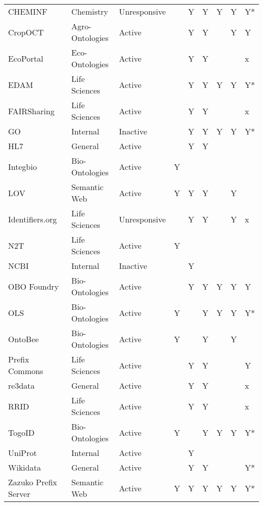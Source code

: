 \begin{table}
\begin{tabular}{lllllllll}
CHEMINF~\cite{Hastings2011} & Chemistry & Unresponsive &  & Y & Y & Y & Y & Y* \\
CropOCT~\cite{Arnaud2020} & Agro-Ontologies & Active &  & Y & Y &  & Y & Y \\
EcoPortal~\cite{Kechagioglou2021} & Eco-Ontologies & Active &  & Y & Y &  &  & x \\
EDAM~\cite{Ison2013} & Life Sciences & Active &  & Y & Y & Y & Y & Y* \\
FAIRSharing~\cite{Sansone2019} & Life Sciences & Active &  & Y & Y &  &  & x \\
GO~\cite{TheGeneOntologyConsortium2019} & Internal & Inactive &  & Y & Y & Y & Y & Y* \\
HL7~\cite{Bender2013} & General & Active &  & Y & Y &  &  &  \\
Integbio & Bio-Ontologies & Active & Y &  &  &  &  &  \\
LOV & Semantic Web & Active & Y & Y & Y &  & Y &  \\
Identifiers.org~\cite{Juty2012} & Life Sciences & Unresponsive &  & Y & Y &  & Y & x \\
N2T~\cite{Wimalaratne2018} & Life Sciences & Active & Y &  &  &  &  &  \\
NCBI~\cite{Clark2016} & Internal & Inactive &  & Y &  &  &  &  \\
OBO Foundry~\cite{Jackson2021} & Bio-Ontologies & Active &  & Y & Y & Y & Y & Y \\
OLS~\cite{Cote2006a} & Bio-Ontologies & Active & Y &  & Y & Y & Y & Y* \\
OntoBee~\cite{Ong2017} & Bio-Ontologies & Active & Y &  & Y &  & Y &  \\
Prefix Commons~\cite{prefixcommons} & Life Sciences & Active &  & Y & Y &  &  & Y \\
re3data~\cite{Pampel2013} & General & Active &  & Y & Y &  &  & x \\
RRID & Life Sciences & Active &  & Y & Y &  &  & x \\
TogoID & Bio-Ontologies & Active & Y &  & Y & Y & Y & Y* \\
UniProt~\cite{Bateman2021} & Internal & Active &  & Y &  &  &  &  \\
Wikidata~\cite{Waagmeester2020} & General & Active &  & Y & Y &  &  & Y* \\
Zazuko Prefix Server & Semantic Web & Active & Y & Y & Y & Y & Y & Y* \\
\bottomrule
\end{tabular}
\end{table}

